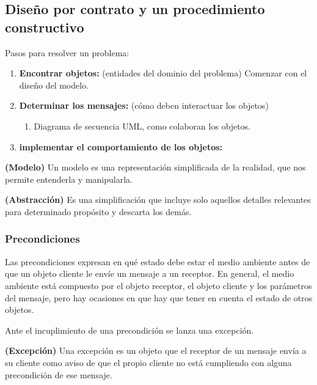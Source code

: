 \documentclass[../main.tex]{subfiles}
\begin{document}
    \subsection{Diseño por contrato y un procedimiento constructivo}
        Pasos para resolver un problema:
        \begin{enumerate}
            \item \textbf{Encontrar objetos:} (entidades del dominio del problema)
                Comenzar con el diseño del modelo.
            \item \textbf{Determinar los mensajes:} (cómo deben interactuar los objetos)
                \begin{enumerate}
                    \item Diagrama de secuencia UML, como colaboran los objetos.
                   \end{enumerate}
            \item \textbf{implementar el comportamiento de los objetos:} 
        \end{enumerate}

        \begin{definition} \textbf{(Modelo)}
            Un modelo es una representación simplificada de la realidad, que nos permite entenderla y manipularla.
        \end{definition}

        \begin{definition} \textbf{(Abstracción)}
            Es una simplificación que incluye solo aquellos detalles relevantes para determinado propósito y descarta los demás.
        \end{definition}

        \subsubsection{Precondiciones}
            Las precondiciones expresan en qué estado debe estar el medio ambiente antes de que un objeto cliente le envíe un mensaje a un receptor. En general, el medio ambiente está compuesto por el objeto receptor, el objeto cliente y los parámetros del mensaje, pero hay ocasiones en que hay que tener en cuenta el estado de otros objetos.

            Ante el incuplimiento de una precondición se lanza una excepción.

            \begin{definition} \textbf{(Excepción)}
                Una excepción es un objeto que el receptor de un mensaje envía a su cliente como aviso de que el propio cliente no está cumpliendo con alguna precondición de ese mensaje.
            \end{definition}
            
\end{document}
